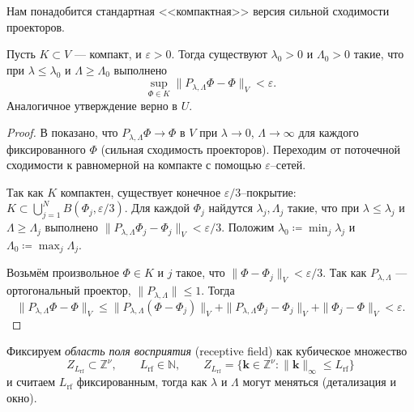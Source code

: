 \documentclass[../NDCNNAI_main.tex]{subfiles}
\begin{document}
Нам понадобится стандартная <<компактная>> версия сильной сходимости проекторов.

\begin{lemma}
\label{lem:proj_approx}
Пусть $K\subset V$ --- компакт, и $\varepsilon>0$.
Тогда существуют $\lambda_0>0$ и $\Lambda_0>0$ такие, что при $\lambda\le\lambda_0$ и $\Lambda\ge\Lambda_0$ выполнено
\[
\sup_{\Phi\in K}\|P_{\lambda,\Lambda}\Phi-\Phi\|_V<\varepsilon.
\]
Аналогичное утверждение верно в $U$.  
\end{lemma}

\begin{proof}
В \cite{Yarotsky2018} показано, что $P_{\lambda,\Lambda}\Phi\to \Phi$ в $V$ при $\lambda\to 0$, $\Lambda\to\infty$
для каждого фиксированного $\Phi$ (сильная сходимость проекторов).
Переходим от поточечной сходимости к равномерной на компакте с помощью $\varepsilon$–сетей.

Так как $K$ компактен, существует конечное $\varepsilon/3$–покрытие: $K\subset\bigcup_{j=1}^N B(\Phi_j,\varepsilon/3)$.
Для каждой $\Phi_j$ найдутся $\lambda_j,\Lambda_j$ такие, что при $\lambda\le\lambda_j$ и $\Lambda\ge\Lambda_j$ выполнено
$\|P_{\lambda,\Lambda}\Phi_j-\Phi_j\|_V<\varepsilon/3$.
Положим $\lambda_0\coloneq \min_j \lambda_j$ и $\Lambda_0\coloneq \max_j\Lambda_j$.

Возьмём произвольное $\Phi\in K$ и $j$ такое, что $\|\Phi-\Phi_j\|_V<\varepsilon/3$.
Так как $P_{\lambda,\Lambda}$ --- ортогональный проектор, $\|P_{\lambda,\Lambda}\|\le 1$. Тогда
\[
\|P_{\lambda,\Lambda}\Phi-\Phi\|_V
\le \|P_{\lambda,\Lambda}(\Phi-\Phi_j)\|_V + \|P_{\lambda,\Lambda}\Phi_j-\Phi_j\|_V + \|\Phi_j-\Phi\|_V
< \varepsilon.
\]
\end{proof}

Фиксируем \emph{область поля восприятия} (receptive field) как кубическое множество
\[
Z_{L_{\mathrm{rf}}}\subset\mathbb{Z}^\nu,\qquad L_{\mathrm{rf}}\in\mathbb{N}, \qquad Z_{L_\mathrm{rf}} = \{\mathbf{k}\in\mathbb{Z}^\nu:\|\mathbf{k}\|_\infty\le L_\mathrm{rf}\}
\]
и считаем $L_{\mathrm{rf}}$ фиксированным, тогда как $\lambda$ и $\Lambda$ могут меняться (детализация и окно).
\end{document}
